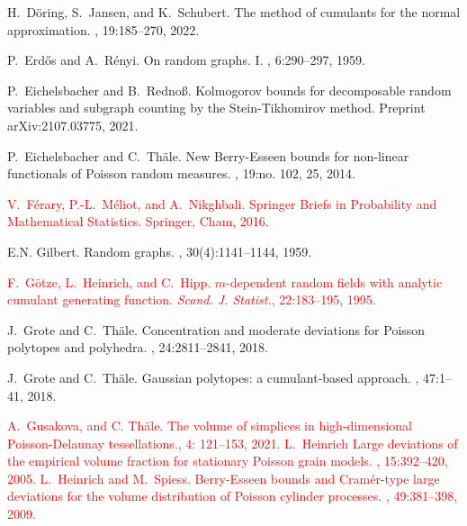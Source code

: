 \documentclass[12pt]{article}
\let\Horig\H
\numberwithin{equation}{section}
\begin{document}
\begin{thebibliography}{BRSW17}
H.~D{\"o}ring, S.~Jansen, and K.~Schubert.
\newblock The method of cumulants for the normal approximation.
, 19:185--270, 2022.

P.~Erd{\Horig{o}}s and A.~R\'enyi.
\newblock On random graphs. {I}.
, 6:290--297, 1959.

P.~Eichelsbacher and B.~Redno{\ss}.
\newblock Kolmogorov bounds for decomposable random variables and subgraph
  counting by the {S}tein-{T}ikhomirov method.
\newblock Preprint arXiv:2107.03775, 2021.

P.~Eichelsbacher and C.~Th{\"a}le.
\newblock New {B}erry-{E}sseen bounds for non-linear functionals of {P}oisson
  random measures.
, 19:no. 102, 25, 2014.

\textcolor{red}{
V.~F\'erary, P.-L.~M\'eliot, and A.~Nikghbali. 
 Springer Briefs in Probability and Mathematical Statistics. Springer, Cham, 2016.
}

E.N. Gilbert.
\newblock Random graphs.
, 30(4):1141--1144, 1959.

\textcolor{red}{
F.~G\"otze, L.~Heinrich, and C.~Hipp. $m$-dependent random fields with analytic cumulant generating function. {\em Scand. J. Statist.}, 22:183--195, 1995. 
}

J.~Grote and C.~Th{\"a}le.
\newblock Concentration and moderate deviations for {P}oisson polytopes and
  polyhedra.
, 24:2811--2841, 2018.

J.~Grote and C.~Th{\"a}le.
\newblock Gaussian polytopes: a cumulant-based approach.
, 47:1--41, 2018.

\textcolor{red}{
  A.~Gusakova, and C. Th{\"a}le. \newblock The volume of simplices in high-dimensional Poisson-Delaunay tessellations., 4: 121--153, 2021.  
L.~Heinrich 
\newblock Large deviations of the empirical volume fraction for stationary Poisson grain models. 
, 15:392--420, 2005.
L.~Heinrich and M.~Spiess. 
\newblock Berry-Esseen bounds and Cram\'er-type large deviations for the volume distribution of Poisson cylinder processes. 
, 49:381--398, 2009.
}


\end{thebibliography}
\end{document}
